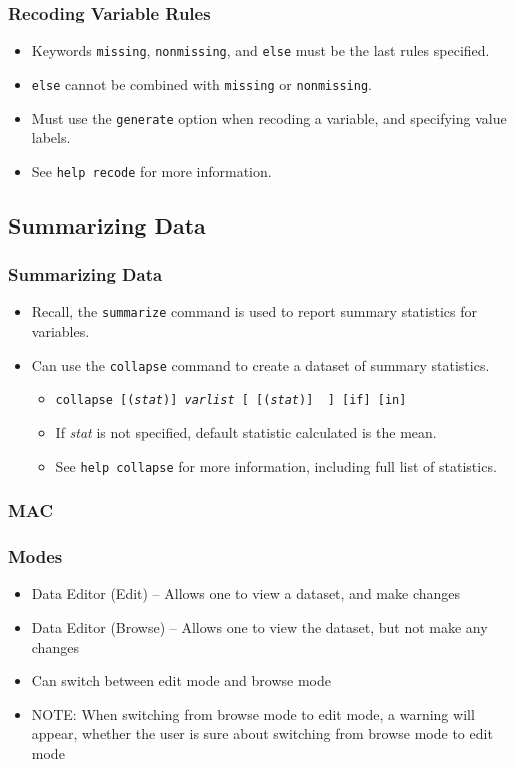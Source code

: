 \documentclass{beamer}
\begin{document}
\begin{frame}
	\frametitle{Recoding Variable Rules}
		\begin{itemize}
			\item Keywords \texttt{missing}, \texttt{nonmissing}, and \texttt{else} must be the last rules specified.
			\item \texttt{else} cannot be combined with \texttt{missing} or \texttt{nonmissing}.
			\item Must use the \texttt{generate} option when recoding a variable, and specifying value labels.
			\item See \texttt{help recode} for more information.
		\end{itemize}
\end{frame}

\subsection{Summarizing Data}

\begin{frame}
	\frametitle{Summarizing Data}
		\begin{itemize}
			\item Recall, the \texttt{summarize} command is used to report summary statistics for variables.
			\item Can use the \texttt{collapse} command to create a dataset of summary statistics.
				\begin{itemize}
					\item \texttt{collapse [(\textit{stat})] \textit{varlist} [ [(\textit{stat})] \textellipsis~] [if] [in]}
					\item If \textit{stat} is not specified, default statistic calculated is the mean.
					\item See \texttt{help collapse} for more information, including full list of statistics.
				\end{itemize}
		\end{itemize}
\end{frame}

\begin{frame}
	\frametitle{MAC}
\end{frame}

\begin{frame}
	\frametitle{Modes}
		\begin{itemize}
			\item Data Editor (Edit) -- Allows one to view a dataset, and make changes
			\item Data Editor (Browse) -- Allows one to view the dataset, but not make any changes
			\item Can switch between edit mode and browse mode
			\item NOTE: When switching from browse mode to edit mode, a warning will appear, whether the user is sure about switching from browse mode to edit mode
		\end{itemize}
\end{frame}
\end{document}
